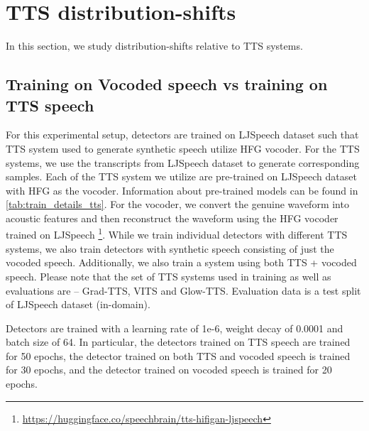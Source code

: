 \section{TTS distribution-shifts}\label{sec:tts_shifts_section}
In this section, we study distribution-shifts relative to TTS systems.

\subsection{Training on Vocoded speech vs training on TTS speech}\label{sec:exp-9}
For this experimental setup, detectors are trained on LJSpeech dataset such that TTS system used to generate synthetic speech utilize HFG vocoder. For the TTS systems, we use the transcripts from LJSpeech dataset to generate corresponding samples. Each of the TTS system we utilize are pre-trained on LJSpeech dataset with HFG as the vocoder. Information about pre-trained models can be found in \autoref{tab:train_details_tts}. For the vocoder, we convert the genuine waveform into acoustic features and then reconstruct the waveform using the HFG vocoder trained on LJSpeech  \footnote{\url{https://huggingface.co/speechbrain/tts-hifigan-ljspeech}}. While we train individual detectors with different TTS systems, we also train detectors with synthetic speech consisting of just the vocoded speech. Additionally, we also train a system using both TTS + vocoded speech. Please note that the set of TTS systems used in training as well as evaluations are -- Grad-TTS, VITS and Glow-TTS. Evaluation data is a test split of LJSpeech dataset (in-domain). 

Detectors are trained with a learning rate of 1e-6, weight decay of 0.0001 and batch size of 64. In particular, the detectors trained on TTS speech are trained for 50 epochs, the detector trained on both TTS and vocoded speech is trained for 30 epochs, and the detector trained on vocoded speech is trained for 20 epochs.



